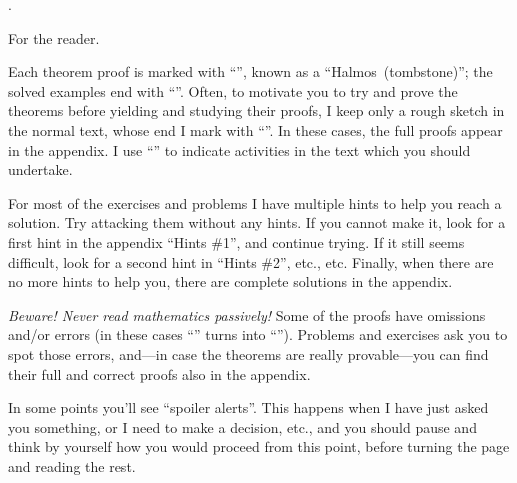 
\chapteroid \prefacename.

\sectionoid For the reader.

Each theorem proof is marked with ``\thinspace\qedsymbol\thinspace'',
known as a ``Halmos\Halmos[tombstone]~(tombstone)'';
the solved examples end with ``\thinspace\qexsymbol\thinspace''.
Often, to motivate you to try and prove the theorems before yielding and studying their proofs,
I keep only a rough sketch in the normal text, whose end I mark with
``\thinspace\qessymbol\thinspace''.
In these cases, the full proofs appear in the appendix.
I use ``\thinspace\activitysymbol\thinspace'' to indicate activities in the text
which you should undertake.

For most of the exercises and problems I have multiple hints to help you
reach a solution.  Try attacking them without any hints.
If you cannot make it, look for a first hint in the appendix ``Hints \#1'',
and continue trying.
If it still seems difficult, look for a second hint in ``Hints \#2'', etc., etc.
Finally, when there are no more hints to help you,
there are complete solutions in the appendix.

\emph{Beware!  Never read mathematics passively!}
Some of the proofs have omissions and/or errors
(in these cases ``\thinspace\qedsymbol\thinspace''
turns into ``\thinspace\mistakesymbol\thinspace'').
Problems and exercises ask you to spot those errors,
and---in case the theorems are really provable---you
can find their full and correct proofs also in the appendix.

In some points you'll see ``spoiler alerts''.
This happens when I have just asked you something, or I need
to make a decision, etc., and you should pause and think by yourself
how you would proceed from this point, before turning the page
and reading the rest.

\endsectionoid

\endchapteroid
